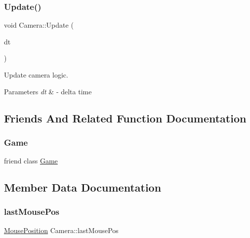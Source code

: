 \subsubsection{\texorpdfstring{Update()}{Update()}}
{\footnotesize\ttfamily void Camera\+::\+Update (\begin{DoxyParamCaption}\item[{G\+Lfloat}]{dt }\end{DoxyParamCaption})}



Update camera logic. 


\begin{DoxyParams}{Parameters}
{\em dt} & -\/ delta time \\
\hline
\end{DoxyParams}


\subsection{Friends And Related Function Documentation}
\mbox{\label{class_camera_aa2fab026580d6f14280c2ffb8063a314}} 
\subsubsection{\texorpdfstring{Game}{Game}}
{\footnotesize\ttfamily friend class \mbox{\hyperlink{class_game}{Game}}\hspace{0.3cm}{\ttfamily [friend]}}



\subsection{Member Data Documentation}
\mbox{\label{class_camera_a452e0aabdcd36e235c2f8705b736482c}} 
\subsubsection{\texorpdfstring{lastMousePos}{lastMousePos}}
{\footnotesize\ttfamily \mbox{\hyperlink{struct_mouse_position}{Mouse\+Position}} Camera\+::last\+Mouse\+Pos\hspace{0.3cm}{\ttfamily [protected]}}

\mbox{\label{class_camera_a481e669a6f96826929e323706543a6a4}} 
